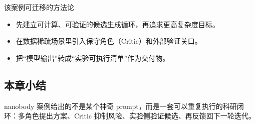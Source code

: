 \begin{knowledgebox}{该案例可迁移的方法论}
\begin{itemize}
    \item 先建立可计算、可验证的候选生成循环，再追求更高复杂度目标。
    \item 在数据稀疏场景里引入保守角色（Critic）和外部验证关口。
    \item 把``模型输出''转成``实验可执行清单''作为交付物。
\end{itemize}
\end{knowledgebox}

\subsection{本章小结}

nanobody 案例给出的不是某个神奇 prompt，而是一套可以重复执行的科研闭环：多角色提出方案、Critic 抑制风险、实验侧验证候选、再反馈回下一轮迭代。

